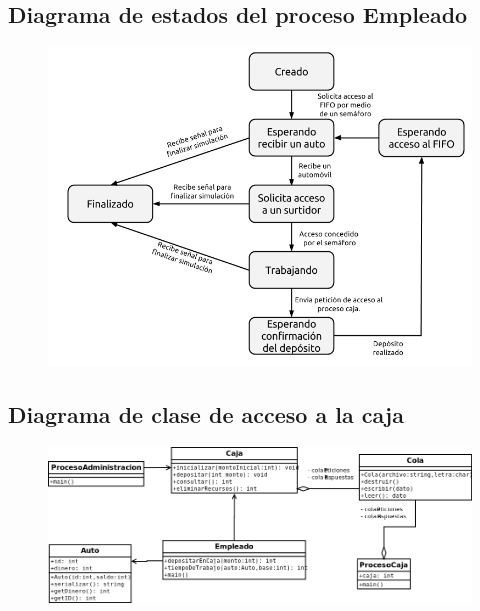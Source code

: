 \documentclass[12pt,a4paper,spanish]{article}
\begin{document}
	\newpage
	\subsection{Diagrama de estados del proceso Empleado}

	\begin{figure}[h]
	\includegraphics[scale=0.60]{FSM_Empleado.png}
	\centering
	\end{figure}

	\newpage
	\subsection{Diagrama de clase de acceso a la caja}

	\begin{figure}[h]
	\includegraphics[angle=90,scale=0.56]{AccesoCaja2.png}
	\centering
	\end{figure}
\end{document}
